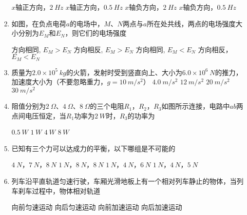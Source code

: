 \begin{enumerate}
\fourchoices
{$ x $轴正方向，$ 2 \ Hz $}
{$ x $轴正方向，$ 0.5 \ Hz $}
{$ x $轴负方向，$ 2 \ Hz $}
{$ x $轴负方向，$ 0.5 \ Hz $}





\item
如图，在负点电荷$ a $的电场中，$ M $、$ N $两点与$ a $所在处共线，两点的电场强度大小分别为$ E_M $和$ E_N $，则它们的电场强度  
\begin{figure}[h!]
\centering

\end{figure}


\fourchoices
{方向相同, $E_{M}>E_{N}$}
{方向相反, $E_{M}>E_{N}$}
{方向相同, $E_{M}<E_{N}$}
{方向相反，$E_{M}<E_{N}$}





\item
质量为$ 2.0 \times 10^{5} \ kg $的火箭，发射时受到竖直向上、大小为$ 6.0 \times 10^{6} \ N $的推力，加速度大小为（不要忽略重力，$ g=10 \ m/s^{2} $）  
\fourchoices
{$ 4.0 \ m/s^{2} $}
{$ 12 \ m/s^{2} $}
{$ 20 \ m/s^{2} $}
{$ 30 \ m/s^{2} $}




\item
阻值分别为$ 2 \ \Omega $、$ 4 \ \Omega $、$ 8 \ \Omega $的三个电阻$ R_{1} $，$ R_{2} $，$ R_{3} $如图所示连接，电路中$ ab $两点间电压恒定，当$ R_{1} $功率为$ 2 \ W $时，$ R_{3} $的功率为  
\begin{figure}[h!]
\centering

\end{figure}

\fourchoices
{$ 0.5 \ W $}
{$ 1 \ W $}
{$ 4 \ W $}
{$ 8 \ W $}




\item
已知有三个力可以达成力的平衡，以下哪组是不可能的  

\fourchoices
{$ 4 \ N $，$ 7 \ N $，$ 8 \ N $}
{$ 1 \ N $，$ 8 \ N $，$ 8 \ N $}
{$ 1 \ N $，$ 4 \ N $，$ 6 \ N $}
{$ 1 \ N $，$ 4 \ N $，$ 5 \ N $}



\item 
列车沿平直轨道匀速行驶，车厢光滑地板上有一个相对列车静止的物体，当列车刹车过程中，物体相对轨道  

\fourchoices
{向前匀速运动}
{向后匀速运动}
{向前加速运动}
{向后加速运动}




\end{enumerate}
